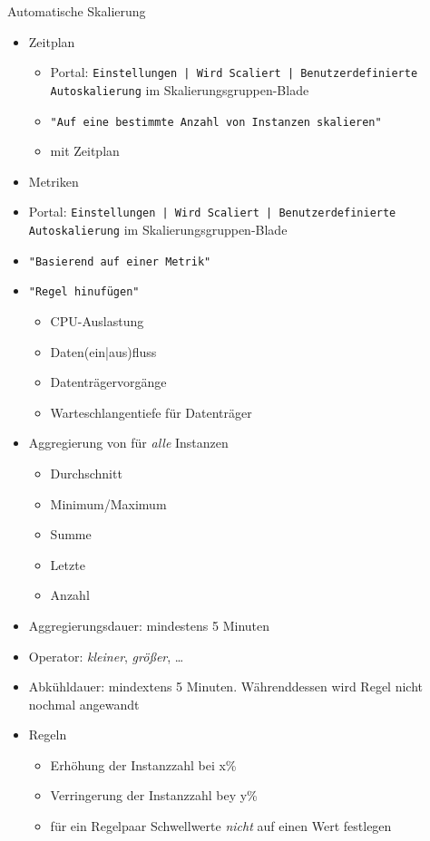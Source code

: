 \begin{flashcard}[Definition]{Automatische Skalierung}
    \begin{itemize}
        \item Zeitplan
            \begin{itemize}
                \item Portal: \texttt{Einstellungen | Wird Scaliert | Benutzerdefinierte Autoskalierung} im Skalierungsgruppen-Blade
                \item \texttt{"Auf eine bestimmte Anzahl von Instanzen skalieren"}
                \item mit Zeitplan
            \end{itemize}
        \item Metriken
            \item Portal: \texttt{Einstellungen | Wird Scaliert | Benutzerdefinierte Autoskalierung} im Skalierungsgruppen-Blade
            \item \texttt{"Basierend auf einer Metrik"}
            \item \texttt{"Regel hinufügen"}
            \begin{itemize}
                \item CPU-Auslastung
                \item Daten(ein|aus)fluss
                \item Datenträgervorgänge
                \item Warteschlangentiefe für Datenträger
            \end{itemize}
        \item Aggregierung von für \emph{alle} Instanzen
            \begin{itemize}
                \item Durchschnitt
                \item Minimum/Maximum
                \item Summe
                \item Letzte
                \item Anzahl
            \end{itemize}
        \item Aggregierungsdauer: mindestens 5 Minuten
        \item Operator: \emph{kleiner}, \emph{größer}, \ldots
        \item Abkühldauer: mindextens 5 Minuten. Währenddessen wird Regel nicht nochmal angewandt
        \item Regeln
            \begin{itemize}
                \item Erhöhung der Instanzzahl bei x\%
                \item Verringerung der Instanzzahl bey y\%
                \item für ein Regelpaar Schwellwerte \emph{nicht} auf einen Wert festlegen
            \end{itemize}

    \end{itemize}
\end{flashcard}

